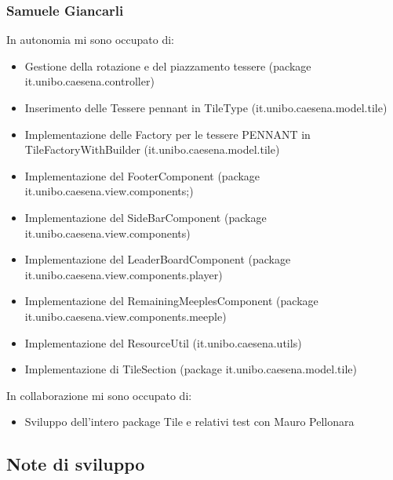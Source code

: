\subsubsection*{Samuele Giancarli}
In autonomia mi sono occupato di:
\begin{itemize}
    \item Gestione della rotazione e del piazzamento tessere (package it.unibo.caesena.controller)
    \item Inserimento delle Tessere pennant in TileType (it.unibo.caesena.model.tile)
    \item Implementazione delle Factory per le tessere PENNANT in TileFactoryWithBuilder (it.unibo.caesena.model.tile)
    \item Implementazione del FooterComponent (package it.unibo.caesena.view.components;)
    \item Implementazione del SideBarComponent (package it.unibo.caesena.view.components)
    \item Implementazione del LeaderBoardComponent (package it.unibo.caesena.view.components.player)
    \item Implementazione del RemainingMeeplesComponent (package it.unibo.caesena.view.components.meeple)
    \item Implementazione del ResourceUtil (it.unibo.caesena.utils)
    \item Implementazione di TileSection (package it.unibo.caesena.model.tile)
\end{itemize}

In collaborazione mi sono occupato di:
\begin{itemize}
    \item Sviluppo dell'intero package Tile e relativi test con Mauro Pellonara
\end{itemize}

\subsection{Note di sviluppo}
